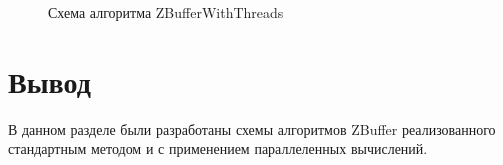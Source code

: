 \begin{figure}
	\caption{Схема алгоритма ZBufferWithThreads}
	\label{ZBufferWithThreads}
\end{figure}

\newpage
\section{Вывод}
В данном разделе были разработаны схемы алгоритмов ZBuffer реализованного стандартным методом и с применением параллеленных вычислений.